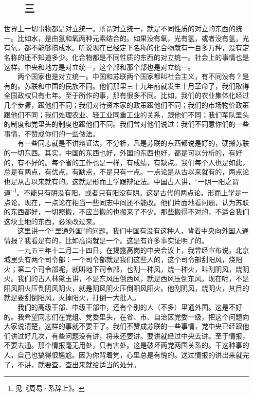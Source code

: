 \documentclass[cn,11pt,chinese]{elegantbook}
\def\myformat#1{\hfil\hfil #1}
\begin{document}
\subsection*{\myformat{　　三}}
世界上一切事物都是对立统一。所谓对立统一，就是不同性质的对立的东西的统一。比如水，是由氢和氧两种元素结合的。如果没有氧，光有氢，或者没有氢，光有氧，都不能够搞成水。听说现在已经定下名称的化合物就有一百多万种，没有定名称的还不知道多少。化合物都是不同性质的东西的对立统一。社会上的事情也是这样。中央和地方是对立统一，这个部和那个部也是对立统一。\\
　　两个国家也是对立统一。中国和苏联两个国家都叫社会主义，有不同没有？是有的。苏联和中国的民族不同。他们那里三十九年前就发生十月革命了，我们取得全国政权只有七年。至于所作的事，那有很多不同。比如，我们的农业集体化经过几个步骤，跟他们不同；我们对待资本家的政策跟他们不同；我们的市场物价政策跟他们不同；我们处理农业、轻工业同重工业的关系，跟他们不同；我们军队里头的制度和党里头的制度也跟他们不同。我们曾对他们说过：我们不同意你们的一些事情，不赞成你们的一些做法。\\
　　有一些同志就是不讲辩证法，不分析，凡是苏联的东西都说是好的，硬搬苏联的一切东西。其实，中国的东西也好，外国的东西也好，都是可以分析的，有好的，有不好的。每个省的工作也是一样，有成绩，有缺点。我们每个人也是如此，总是有两点，有优点，有缺点，不是只有一点。一点论是从古以来就有的，两点论也是从古以来就有的。这就是形而上学跟辩证法。中国古人讲，“一阴一阳之谓道”\footnote[3]{ 见《周易·系辞上》。}。不能只有阴没有阳，或者只有阳没有阴。这是古代的两点论。形而上学是一点论。现在，一点论在相当一些同志中间还不能改。他们片面地看问题，认为苏联的东西都好，一切照搬，不应当搬的也搬来了不少。那些搬得不对的，不适合我们这块土地的东西，必须改过来。\\
　　这里讲一个“里通外国”的问题。我们中国有没有这种人，背着中央向外国人通情报？我看是有的，比如高岗就是一个。这是有许多事实证明了的。\\
　　一九五三年十二月二十四日，在揭露高岗的中央会议上，我曾经宣布说，北京城里头有两个司令部：一个司令部就是我们这些人的，这个司令部刮阳风，烧阳火；第二个司令部呢，就叫地下司令部，也刮一种风，烧一种火，叫刮阴风，烧阴火。我们的古人林黛玉讲，不是东风压倒西风，就是西风压倒东风。现在呢，不是阳风阳火压倒阴风阴火，就是阴风阴火压倒阳风阳火。他刮阴风，烧阴火，其目的就是要刮倒阳风，灭掉阳火，打倒一大批人。\\
　　我们的高级干部、中级干部中，还有个别的人（不多）里通外国。这是不好的。我希望同志们在党组、党委里头，在省、市、自治区党委一级，把这个问题向大家说清楚，这样的事就不要干了。我们不赞成苏联的一些事情，党中央已经跟他们讲过好几次，有些问题没有讲，将来还要讲。要讲就经过中央去讲。至于情报，不要去通。那个情报毫无用处，只有害处。这是破坏两党两国关系的。干这种事的人，自己也搞得很尴尬。因为你背着党，心里总是有愧的。送过情报的讲出来就完了，不讲，就要查，查出来就给适当的处分。\\
\end{document}
